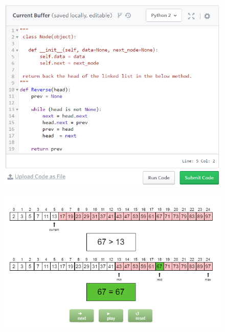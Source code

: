 \documentclass[bsc,twoside,singlespacing,parskip,logo,notimes,normalheadings]{infthesis}
\begin{document}
    \begin{figure}[b]
      \hspace{2mm}
      \begin{minipage}{.48\textwidth}
        \includegraphics[width=\textwidth, trim=20 20 0 30]{img/hackerrank.png}
        \captionsetup{width=\textwidth, justification=centering}
        \label{fig:hrlinkedlist}
      \end{minipage}%
      \quad
      \begin{minipage}{.48\textwidth}
        \includegraphics[width=\textwidth, trim=0 -37 0 -37]{img/khansearch.png}
        \captionsetup{width=\textwidth, justification=centering}
        \label{fig:khanbinsearch}
      \end{minipage}
    \end{figure}
\end{document}

